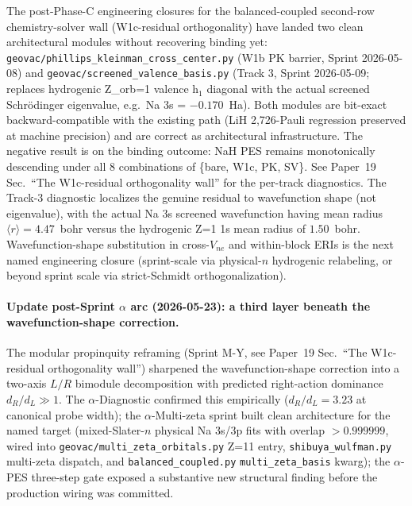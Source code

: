 \documentclass[aps,pra,twocolumn,superscriptaddress,longbibliography,floatfix]{revtex4-2}
\begin{document}
The post-Phase-C engineering closures for the balanced-coupled
second-row chemistry-solver wall (W1c-residual orthogonality) have
landed two clean architectural modules without recovering binding
yet: \texttt{geovac/phillips\_kleinman\_cross\_center.py} (W1b PK
barrier, Sprint 2026-05-08) and
\texttt{geovac/screened\_valence\_basis.py} (Track 3, Sprint
2026-05-09; replaces hydrogenic Z\_orb=1 valence h$_1$ diagonal with
the actual screened Schr\"odinger eigenvalue, e.g.\ Na 3s = $-0.170$~Ha).
Both modules are bit-exact backward-compatible with the existing path
(LiH 2{,}726-Pauli regression preserved at machine precision) and are
correct as architectural infrastructure. The negative result is on
the binding outcome: NaH PES remains monotonically descending under
all 8 combinations of \{bare, W1c, PK, SV\}. See Paper~19
Sec.~``The W1c-residual orthogonality wall'' for the per-track diagnostics. The
Track-3 diagnostic localizes the genuine residual to wavefunction
shape (not eigenvalue), with the actual Na 3s screened wavefunction
having mean radius $\langle r \rangle = 4.47$~bohr versus the
hydrogenic Z=1 1s mean radius of $1.50$~bohr. Wavefunction-shape
substitution in cross-$V_{ne}$ and within-block ERIs is the next
named engineering closure (sprint-scale via physical-$n$ hydrogenic
relabeling, or beyond sprint scale via strict-Schmidt
orthogonalization).

\paragraph{Update post-Sprint $\alpha$ arc (2026-05-23): a third layer
beneath the wavefunction-shape correction.}
The modular propinquity reframing (Sprint M-Y, see Paper~19
Sec.~``The W1c-residual orthogonality wall'') sharpened the wavefunction-shape
correction into a two-axis $L/R$ bimodule decomposition with predicted
right-action dominance $d_R / d_L \gg 1$.  The $\alpha$-Diagnostic
confirmed this empirically ($d_R/d_L = 3.23$ at canonical probe
width); the $\alpha$-Multi-zeta sprint built clean architecture for
the named target (mixed-Slater-$n$ physical Na 3s/3p fits with overlap
$> 0.999999$, wired into \texttt{geovac/multi\_zeta\_orbitals.py} Z=11
entry, \texttt{shibuya\_wulfman.py} multi-zeta dispatch, and
\texttt{balanced\_coupled.py} \texttt{multi\_zeta\_basis} kwarg); the
$\alpha$-PES three-step gate exposed a substantive new structural
finding before the production wiring was committed.
\end{document}
